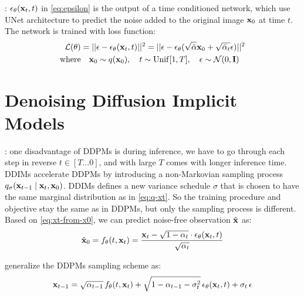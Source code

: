 : $\epsilon_\theta ({\mathbf{x}}_t, t)$ in 
\cref{eq:epsilon} is the output of a time conditioned network, which \cite{hoDDPM} use UNet architecture to predict the noise added to the original image ${\mathbf{x}}_0$ at time $t$. The network is trained with loss function: 
\begin{align}
    \mathcal{L} (\theta) &= ||\epsilon - \epsilon_{\theta} ({\mathbf{x}}_t, t) ||^2 = || \epsilon - \epsilon_{\theta}(\sqrt{\bar\alpha} {\mathbf{x}}_0 + \sqrt{\bar\alpha_t} \epsilon)||^2 \label{eq:loss-ddpm} \\
    \mathrm{where} &\quad {\mathbf{x}}_0 \sim q({\mathbf{x}}_0), \quad t \sim \mathrm{Unif}[1, T], \quad \epsilon \sim {\mathcal{N}}(0, {\mathbf{I}}) \nonumber
\end{align}

\section{Denoising Diffusion Implicit Models}
\label{sec:ddim}

: one disadvantage of \ac{DDPMs} is during inference, we have to go through each step in reverse $t \in [T ... 0]$, and with large $T$ comes with longer inference time. \ac{DDIMs} \cite{songDDIM} accelerate \ac{DDPMs} by introducing a non-Markovian sampling process $q_{\sigma}({\mathbf{x}}_{t-1} \mid {\mathbf{x}}_t, {\mathbf{x}}_0)$. \ac{DDIMs} defines a new variance schedule $\sigma$ that is chosen to have the same marginal distribution as in \cref{eq:q-xt}. So the training procedure and objective stay the same as in \ac{DDPMs}, but only the sampling process is different. Based on \cref{eq:xt-from-x0}, we can predict noise-free observation $\hat{{\mathbf{x}}}$ as: 
\begin{align}
    \hat{{\mathbf{x}}}_0 = f_{\theta}(t, {\mathbf{x}}_t) = \frac{{\mathbf{x}}_t - \sqrt{1 - \alpha_t} \cdot \epsilon_{\theta}({\mathbf{x}}_t, t)}{\sqrt{\alpha_t}} \label{eq:pred-x0-from-xt}
\end{align}

\cite{songDDIM} generalize the \ac{DDPMs} sampling scheme as: 
\begin{align}
    {\mathbf{x}}_{t-1} = \sqrt{\alpha_{t-1}} \, f_{\theta}(t, {\mathbf{x}}_t) + \sqrt{1 - \alpha_{t-1} - \sigma_t^2} \, \epsilon_{\theta}({\mathbf{x}}_t, t) + \sigma_t \, \epsilon \label{eq:ddim-sample-xt}
\end{align}

